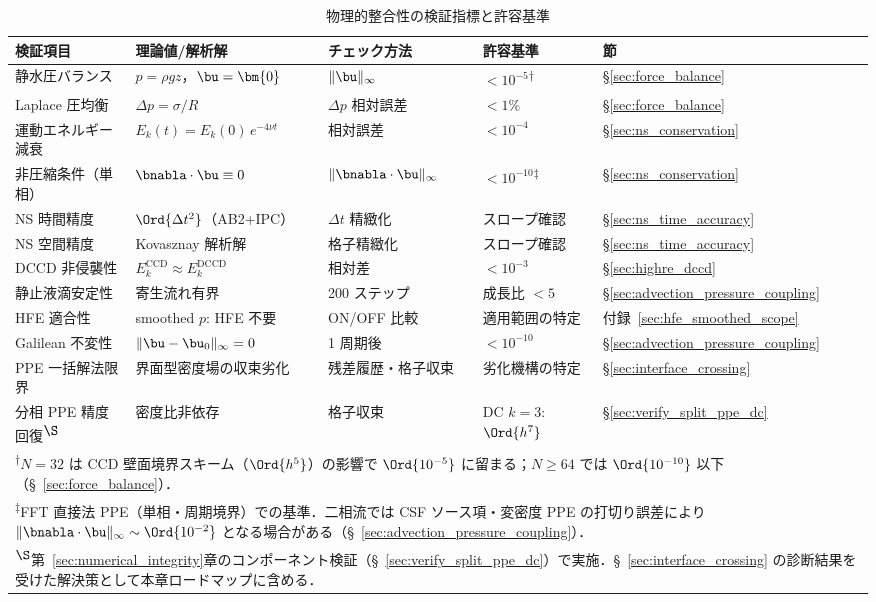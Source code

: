 \begin{table}[htbp]
\centering
\caption{物理的整合性の検証指標と許容基準}
\label{tab:verification}
\renewcommand{\arraystretch}{1.3}
\begin{tabular}{p{32mm}p{34mm}p{26mm}p{20mm}l}
\toprule
検証項目 & 理論値/解析解 & チェック方法 & 許容基準 & 節 \\
\midrule
静水圧バランス & $p = \rho g z$，$\bu = \bm{0}$ & $\|\bu\|_\infty$ & $< 10^{-5}$\textsuperscript{$\dagger$} & §\ref{sec:force_balance}\\
Laplace 圧均衡 & $\Delta p = \sigma/R$ & $\Delta p$ 相対誤差 & $< 1\%$ & §\ref{sec:force_balance}\\
運動エネルギー減衰 & $E_k(t) = E_k(0)\,e^{-4\nu t}$ & 相対誤差 & $< 10^{-4}$ & §\ref{sec:ns_conservation}\\
非圧縮条件（単相） & $\bnabla\cdot\bu \equiv 0$ & $\|\bnabla\cdot\bu\|_\infty$ & $< 10^{-10}$\textsuperscript{$\ddagger$} & §\ref{sec:ns_conservation}\\
NS 時間精度 & $\Ord{\Delta t^2}$（AB2+IPC） & $\Delta t$ 精緻化 & スロープ確認 & §\ref{sec:ns_time_accuracy}\\
NS 空間精度 & Kovasznay 解析解 & 格子精緻化 & スロープ確認 & §\ref{sec:ns_time_accuracy}\\
DCCD 非侵襲性 & $E_k^{\text{CCD}} \approx E_k^{\text{DCCD}}$ & 相対差 & $< 10^{-3}$ & §\ref{sec:highre_dccd}\\
静止液滴安定性 & 寄生流れ有界 & 200 ステップ & 成長比 $< 5$ & §\ref{sec:advection_pressure_coupling}\\
HFE 適合性 & smoothed $p$: HFE 不要 & ON/OFF 比較 & 適用範囲の特定 & 付録~\ref{sec:hfe_smoothed_scope}\\
Galilean 不変性 & $\|\bu - \bu_0\|_\infty = 0$ & 1 周期後 & $< 10^{-10}$ & §\ref{sec:advection_pressure_coupling}\\
PPE 一括解法限界 & 界面型密度場の収束劣化 & 残差履歴・格子収束 & 劣化機構の特定 & §\ref{sec:interface_crossing}\\
分相 PPE 精度回復\textsuperscript{$\S$} & 密度比非依存 & 格子収束 & DC $k{=}3$: $\Ord{h^7}$ & §\ref{sec:verify_split_ppe_dc}\\
\bottomrule
\multicolumn{5}{l}{\footnotesize \textsuperscript{$\dagger$}$N{=}32$ は CCD 壁面境界スキーム（$\Ord{h^5}$）の影響で $\Ord{10^{-5}}$ に留まる；$N{\geq}64$ では $\Ord{10^{-10}}$ 以下（§~\ref{sec:force_balance}）．} \\
\multicolumn{5}{l}{\footnotesize \textsuperscript{$\ddagger$}FFT 直接法 PPE（単相・周期境界）での基準．二相流では CSF ソース項・変密度 PPE の打切り誤差により $\|\bnabla\cdot\bu\|_\infty \sim \Ord{10^{-2}}$ となる場合がある（§~\ref{sec:advection_pressure_coupling}）．} \\
\multicolumn{5}{l}{\footnotesize \textsuperscript{$\S$}第~\ref{sec:numerical_integrity}章のコンポーネント検証（§~\ref{sec:verify_split_ppe_dc}）で実施．§~\ref{sec:interface_crossing} の診断結果を受けた解決策として本章ロードマップに含める．} \\
\end{tabular}
\end{table}
